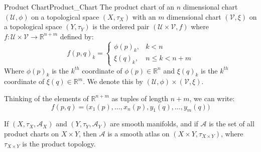 \documentclass[oneside]{book}                                                  %
\begin{document}
            \begin{fdefinition}{Product Chart}{Product_Chart}
                The product chart of an $n$ dimensional chart $(\mathcal{U},\phi)$
                on a topological space $(X,\tau_{X})$ with an $m$ dimensional chart
                $(\mathcal{V},\xi)$ on a topological space $(Y,\tau_{Y})$ is
                the ordered pair $(\mathcal{U}\times\mathcal{V},f)$ where
                $f:\mathcal{U}\times\mathcal{V}\rightarrow\mathbb{R}^{n+m}$
                defined by:
                \begin{equation}
                    f(p,q)_{k}=
                    \begin{cases}
                        \phi(p)_{k},&k<n\\
                        \xi(q)_{k},&n\leq{k}<n+m
                    \end{cases}
                \end{equation}
                Where $\phi(p)_{k}$ is the $k^{th}$ coordinate of
                $\phi(p)\in\mathbb{R}^{n}$ and $\xi(q)_{k}$ is the $k^{th}$
                coordinate of $\xi(q)\in\mathbb{R}^{m}$. We denote this by
                $(\mathcal{U},\phi)\times(\mathcal{V},\xi)$.
            \end{fdefinition}
            Thinking of the elements of $\mathbb{R}^{n+m}$ as tuples of length
            $n+m$, we can write:
            \begin{equation}
                f(p,q)=\big(x_{1}(p),\dots,x_{n}(p),y_{1}(q),\dots,y_{m}(q)\big)
            \end{equation}
            \begin{theorem}
                If $(X,\tau_{X},\mathcal{A}_{X})$ and $(Y,\tau_{Y},\mathcal{A}_{Y})$
                are smooth manifolds, and if $\mathcal{A}$ is the set of all
                product charts on $X\times{Y}$, then $\mathcal{A}$ is a smooth
                atlas on $(X\times{Y},\tau_{X\times{Y}})$, where
                $\tau_{X\times{Y}}$ is the product topology.
            \end{theorem}
\end{document}
